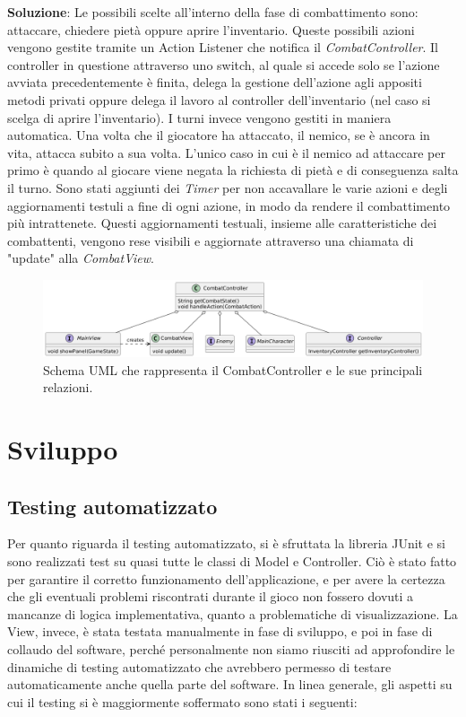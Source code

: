 \documentclass[a4paper,12pt]{report}
\begin{document}
\textbf{Soluzione}: Le possibili scelte all'interno della fase di combattimento sono: attaccare, chiedere pietà oppure
aprire l'inventario. Queste possibili azioni vengono gestite tramite un Action Listener che notifica
il \textit{CombatController}. Il controller in questione attraverso uno switch, al quale si accede solo se l'azione avviata
precedentemente è finita, delega la gestione dell'azione agli appositi metodi privati oppure delega il lavoro al controller
dell'inventario (nel caso si scelga di aprire l'inventario). 
I turni invece vengono gestiti in maniera automatica. Una volta che il giocatore ha attaccato, il nemico, se è ancora in vita, 
attacca subito a sua volta. L'unico caso in cui è il nemico ad attaccare per primo è quando al giocare viene negata
la richiesta di pietà e di conseguenza salta il turno.
Sono stati aggiunti dei \textit{Timer} per non accavallare le varie azioni e degli aggiornamenti testuli a fine di ogni azione, in modo da
rendere il combattimento più intrattenete. Questi aggiornamenti testuali, insieme alle caratteristiche dei combattenti, vengono
rese visibili e aggiornate attraverso una chiamata di "update" alla \textit{CombatView}. 
\begin{figure}[H]
	\centering{}
	\includegraphics[width=\textwidth]{img/combatController.png}
	\caption{Schema UML che rappresenta il CombatController e le sue principali relazioni.}
	\label{img:combatController}
\end{figure}

\chapter{Sviluppo}
\section{Testing automatizzato}

Per quanto riguarda il testing automatizzato, si è sfruttata la libreria JUnit e si sono realizzati test su quasi tutte le classi di Model e Controller. Ciò è stato fatto per garantire il corretto funzionamento dell’applicazione, e per avere la certezza che gli eventuali problemi riscontrati durante il gioco non fossero dovuti a mancanze di logica implementativa, quanto a problematiche di visualizzazione. 
%
\newline La View, invece, è stata testata manualmente in fase di sviluppo, e poi in fase di collaudo del software, perché personalmente non siamo riusciti ad approfondire le dinamiche di testing automatizzato che avrebbero permesso di testare automaticamente anche quella parte del software.
%
\newline In linea generale, gli aspetti su cui il testing si è maggiormente soffermato sono stati i seguenti:
\end{document}
